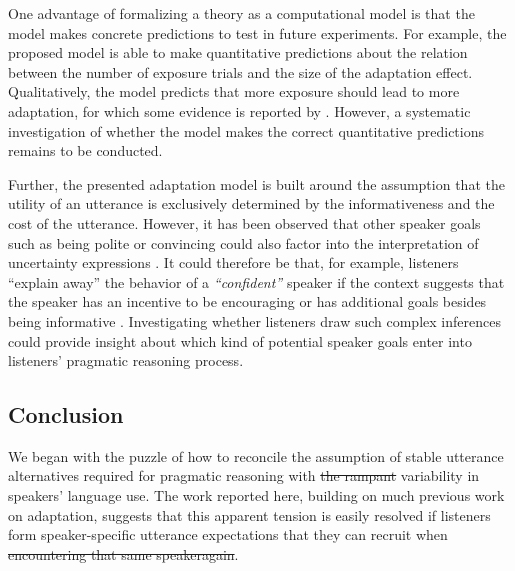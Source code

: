 \documentclass[man, floatsintext]{apa6}
\newcommand{\jd}[1]{\textcolor{PinkyPurple}{\textbf{[jd: #1]}}}
\providecommand{\DIFadd}[1]{{\protect\color{blue}\uwave{#1}}} %
\providecommand{\DIFdel}[1]{{\protect\color{red}\sout{#1}}}                      %
\providecommand{\DIFaddbegin}{} %
\providecommand{\DIFaddend}{} %
\providecommand{\DIFdelbegin}{} %
\providecommand{\DIFdelend}{} %
\newcommand{\DIFscaledelfig}{0.5}
\newlength{\DIFdelgraphicswidth} %
\newlength{\DIFdelgraphicsheight} %
\newcommand{\DIFaddincludegraphics}[2][]{{\color{blue}\fbox{\DIFOincludegraphics[#1]{#2}}}} %
\newcommand{\DIFdelincludegraphics}[2][]{%
\sbox{\DIFdelgraphicsbox}{\DIFOincludegraphics[#1]{#2}}%
\settoboxwidth{\DIFdelgraphicswidth}{\DIFdelgraphicsbox} %
\settoboxtotalheight{\DIFdelgraphicsheight}{\DIFdelgraphicsbox} %
\scalebox{\DIFscaledelfig}{%
\parbox[b]{\DIFdelgraphicswidth}{\usebox{\DIFdelgraphicsbox}\\[-\baselineskip] \rule{\DIFdelgraphicswidth}{0em}}\llap{\resizebox{\DIFdelgraphicswidth}{\DIFdelgraphicsheight}{%
\setlength{\unitlength}{\DIFdelgraphicswidth}%
\begin{picture}(1,1)%
\thicklines\linethickness{2pt} %
{\color[rgb]{1,0,0}\put(0,0){\framebox(1,1){}}}%
{\color[rgb]{1,0,0}\put(0,0){\line( 1,1){1}}}%
{\color[rgb]{1,0,0}\put(0,1){\line(1,-1){1}}}%
\end{picture}%
}\hspace*{3pt}}} %
} %
\DeclareRobustCommand{\DIFaddbegin}{\DIFOaddbegin \let\includegraphics\DIFaddincludegraphics} %
\DeclareRobustCommand{\DIFaddend}{\DIFOaddend \let\includegraphics\DIFOincludegraphics} %
\DeclareRobustCommand{\DIFdelbegin}{\DIFOdelbegin \let\includegraphics\DIFdelincludegraphics} %
\DeclareRobustCommand{\DIFdelend}{\DIFOaddend \let\includegraphics\DIFOincludegraphics} %
\begin{document}

One advantage of formalizing a theory as a computational model is that the model 
makes concrete predictions to test in future experiments. For example, the proposed
model is able to make quantitative predictions about the relation between the number of exposure
trials and the size of the adaptation effect. Qualitatively, the model predicts that more exposure
should lead to more adaptation, for which some evidence is reported by \textcite{Schuster2019}.
However,  a systematic investigation of whether the model makes the correct quantitative predictions remains to be conducted. 


Further, the presented adaptation model is built around the assumption that the utility of an utterance is exclusively determined
by the informativeness and the cost of the utterance. However, it has been observed that other speaker goals such as being polite or
convincing could also factor into the interpretation of uncertainty expressions \parencite[see e.g,][]{Pighin2011,Juanchich2013,Holtgraves2016}.
It could therefore be that, for example, listeners ``explain away'' the behavior of a \textit{``confident''} speaker if the context suggests that the speaker
has an incentive to be encouraging or has additional goals besides being informative \parencite[see also][]{Yoon2016,Yoon2017}. Investigating whether listeners draw such complex inferences
could provide  insight about which kind of potential speaker goals enter into listeners' pragmatic reasoning process.


\subsection{Conclusion}

We began with the puzzle of how to reconcile the assumption of stable utterance alternatives required for pragmatic reasoning with \DIFdelbegin \DIFdel{the rampant }\DIFdelend variability in speakers'  language use. The work reported here, building on much previous work on adaptation, suggests that this apparent tension is easily resolved if listeners form speaker-specific utterance expectations that they can recruit when \DIFdelbegin \DIFdel{encountering that same speakeragain}\DIFdelend \DIFaddbegin \DIFadd{interpreting utterances by that speaker}\DIFaddend .
\end{document}
